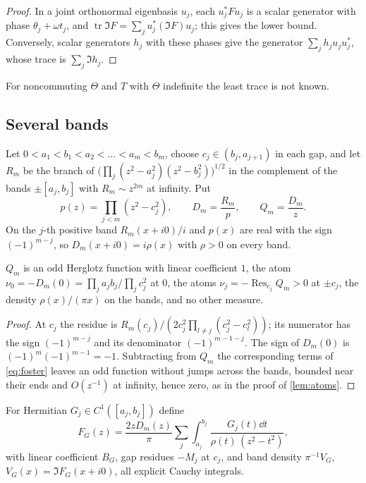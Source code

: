 \begin{proof}
In a joint orthonormal eigenbasis $u_j$, each $u_j^*Fu_j$ is a scalar
generator with phase $\theta_j+\omega t_j$, and
$\operatorname{tr}\Im F=\sum_ju_j^*(\Im F)u_j$; this gives the lower bound.
Conversely, scalar generators $h_j$ with these phases give the generator
$\sum_jh_ju_ju_j^*$, whose trace is $\sum_j\Im h_j$.
\end{proof}

For noncommuting $\Theta$ and $T$ with $\Theta$ indefinite the least trace is not
known.

\subsection{Several bands}\label{ssec:bands}

Let $0<a_1<b_1<a_2<\dots<a_m<b_m$, choose $c_j\in(b_j,a_{j+1})$ in each gap,
and let $R_m$ be the branch of $\big(\prod_j(z^2-a_j^2)(z^2-b_j^2)\big)^{1/2}$
in the complement of the bands $\pm[a_j,b_j]$ with $R_m\sim z^{2m}$ at
infinity. Put
\[
p(z)=\prod_{j<m}(z^2-c_j^2),\qquad D_m=\frac{R_m}p,\qquad Q_m=\frac{D_m}z .
\]
On the $j$-th positive band $R_m(x+i0)/i$ and $p(x)$ are real with the sign
$(-1)^{m-j}$, so $D_m(x+i0)=i\rho(x)$ with $\rho>0$ on every band.

\begin{lemma}\label{lem:multicomp}
$Q_m$ is an odd Herglotz function with linear coefficient $1$, the atom
$\nu_0=-D_m(0)=\prod_ja_jb_j/\prod_jc_j^2$ at $0$, the atoms
$\nu_j=-\operatorname{Res}_{c_j}Q_m>0$ at $\pm c_j$, the density
$\rho(x)/(\pi x)$ on the bands, and no other measure.
\end{lemma}

\begin{proof}
At $c_j$ the residue is $R_m(c_j)/(2c_j^2\prod_{l\ne j}(c_j^2-c_l^2))$; its
numerator has the sign $(-1)^{m-j}$ and its denominator $(-1)^{m-1-j}$. The
sign of $D_m(0)$ is $(-1)^m(-1)^{m-1}=-1$. Subtracting from $Q_m$ the
corresponding terms of \eqref{eq:foster} leaves an odd function without jumps
across the bands, bounded near their ends and $O(z^{-1})$ at infinity, hence
zero, as in the proof of \cref{lem:atoms}.
\end{proof}

For Hermitian $G_j\in C^1([a_j,b_j])$ define
\[
F_G(z)=\frac{2zD_m(z)}\pi\sum_j\int_{a_j}^{b_j}\frac{G_j(t)\dd t}{\rho(t)\,(z^2-t^2)},
\]
with linear coefficient $B_G$, gap residues $-M_j$ at $c_j$, and band density
$\pi^{-1}V_G$, $V_G(x)=\Im F_G(x+i0)$, all explicit Cauchy integrals.

